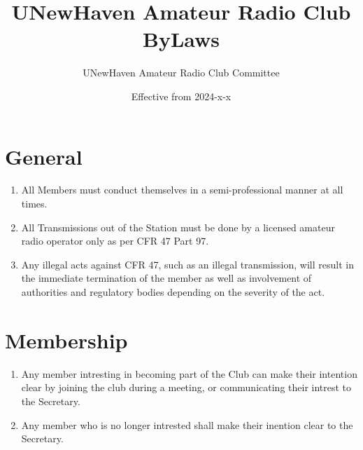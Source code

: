 \documentclass[a4paper,12pt]{article}
\title{UNewHaven Amateur Radio Club ByLaws}
\author{UNewHaven Amateur Radio Club Committee}
\date{Effective from 2024-x-x}
\begin{document}
\maketitle

\section{General}
\begin{enumerate}[label=\thesection.\arabic*.]
  \item All Members must conduct themselves in a semi-professional manner at all times.
  \item All Transmissions out of the Station must be done by a licensed amateur radio operator only as per CFR 47 Part 97.
  \item Any illegal acts against CFR 47, such as an illegal transmission, will result in the immediate termination of the member as well as involvement of authorities and regulatory bodies depending on the severity of the act.
\end{enumerate}

\section{Membership}
\begin{enumerate}[label=\thesection.\arabic*.]
  \item Any member intresting in becoming part of the Club can make their intention clear by joining the club during a meeting, or communicating their intrest to the Secretary.
  \item Any member who is no longer intrested shall make their inention clear to the Secretary.
\end{enumerate}
\end{document}
